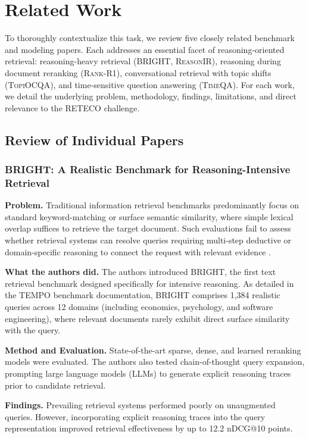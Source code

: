 \section{Related Work}
\label{sec:related}

To thoroughly contextualize this task, we review five closely related benchmark and modeling papers. Each addresses an essential facet of reasoning-oriented retrieval: reasoning-heavy retrieval (\textsc{BRIGHT}, \textsc{ReasonIR}), reasoning during document reranking (\textsc{Rank-R1}), conversational retrieval with topic shifts (\textsc{TopiOCQA}), and time-sensitive question answering (\textsc{TimeQA}). For each work, we detail the underlying problem, methodology, findings, limitations, and direct relevance to the RETECO challenge.

\subsection{Review of Individual Papers}

\subsubsection{BRIGHT: A Realistic Benchmark for Reasoning-Intensive Retrieval}
\textbf{Problem.} Traditional information retrieval benchmarks predominantly focus on standard keyword-matching or surface semantic similarity, where simple lexical overlap suffices to retrieve the target document. Such evaluations fail to assess whether retrieval systems can resolve queries requiring multi-step deductive or domain-specific reasoning to connect the request with relevant evidence \cite{bright}.

\textbf{What the authors did.} The authors introduced \textsc{BRIGHT}, the first text retrieval benchmark designed specifically for intensive reasoning. As detailed in the TEMPO benchmark documentation, \textsc{BRIGHT} comprises 1,384 realistic queries across 12 domains (including economics, psychology, and software engineering), where relevant documents rarely exhibit direct surface similarity with the query.

\textbf{Method and Evaluation.} State-of-the-art sparse, dense, and learned reranking models were evaluated. The authors also tested chain-of-thought query expansion, prompting large language models (LLMs) to generate explicit reasoning traces prior to candidate retrieval.

\textbf{Findings.} Prevailing retrieval systems performed poorly on unaugmented queries. However, incorporating explicit reasoning traces into the query representation improved retrieval effectiveness by up to 12.2 nDCG@10 points.


